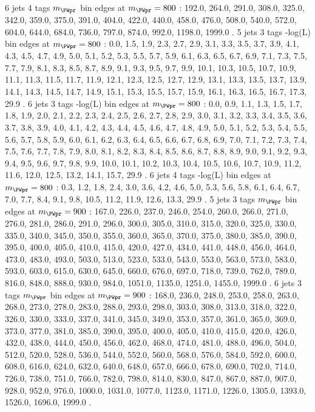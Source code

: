 6 jets 4 \Pqb tags $m_{\PWpr}$ bin edges at $m_{\PWpr}=800$ \GeV:
192.0, 264.0, 291.0, 308.0, 325.0, 342.0, 359.0, 375.0, 391.0, 404.0, 422.0, 440.0, 458.0, 476.0, 508.0, 540.0, 572.0, 604.0, 644.0, 684.0, 736.0, 797.0, 874.0, 992.0, 1198.0, 1999.0 .
5 jets 3 \Pqb tags -log(L) bin edges at $m_{\PWpr}=800$ \GeV:
0.0, 1.5, 1.9, 2.3, 2.7, 2.9, 3.1, 3.3, 3.5, 3.7, 3.9, 4.1, 4.3, 4.5, 4.7, 4.9, 5.0, 5.1, 5.2, 5.3, 5.5, 5.7, 5.9, 6.1, 6.3, 6.5, 6.7, 6.9, 7.1, 7.3, 7.5, 7.7, 7.9, 8.1, 8.3, 8.5, 8.7, 8.9, 9.1, 9.3, 9.5, 9.7, 9.9, 10.1, 10.3, 10.5, 10.7, 10.9, 11.1, 11.3, 11.5, 11.7, 11.9, 12.1, 12.3, 12.5, 12.7, 12.9, 13.1, 13.3, 13.5, 13.7, 13.9, 14.1, 14.3, 14.5, 14.7, 14.9, 15.1, 15.3, 15.5, 15.7, 15.9, 16.1, 16.3, 16.5, 16.7, 17.3, 29.9 .
6 jets 3 \Pqb tags -log(L) bin edges at $m_{\PWpr}=800$ \GeV:
0.0, 0.9, 1.1, 1.3, 1.5, 1.7, 1.8, 1.9, 2.0, 2.1, 2.2, 2.3, 2.4, 2.5, 2.6, 2.7, 2.8, 2.9, 3.0, 3.1, 3.2, 3.3, 3.4, 3.5, 3.6, 3.7, 3.8, 3.9, 4.0, 4.1, 4.2, 4.3, 4.4, 4.5, 4.6, 4.7, 4.8, 4.9, 5.0, 5.1, 5.2, 5.3, 5.4, 5.5, 5.6, 5.7, 5.8, 5.9, 6.0, 6.1, 6.2, 6.3, 6.4, 6.5, 6.6, 6.7, 6.8, 6.9, 7.0, 7.1, 7.2, 7.3, 7.4, 7.5, 7.6, 7.7, 7.8, 7.9, 8.0, 8.1, 8.2, 8.3, 8.4, 8.5, 8.6, 8.7, 8.8, 8.9, 9.0, 9.1, 9.2, 9.3, 9.4, 9.5, 9.6, 9.7, 9.8, 9.9, 10.0, 10.1, 10.2, 10.3, 10.4, 10.5, 10.6, 10.7, 10.9, 11.2, 11.6, 12.0, 12.5, 13.2, 14.1, 15.7, 29.9 .
6 jets 4 \Pqb tags -log(L) bin edges at $m_{\PWpr}=800$ \GeV:
0.3, 1.2, 1.8, 2.4, 3.0, 3.6, 4.2, 4.6, 5.0, 5.3, 5.6, 5.8, 6.1, 6.4, 6.7, 7.0, 7.7, 8.4, 9.1, 9.8, 10.5, 11.2, 11.9, 12.6, 13.3, 29.9 .
5 jets 3 \Pqb tags $m_{\PWpr}$ bin edges at $m_{\PWpr}=900$ \GeV:
167.0, 226.0, 237.0, 246.0, 254.0, 260.0, 266.0, 271.0, 276.0, 281.0, 286.0, 291.0, 296.0, 300.0, 305.0, 310.0, 315.0, 320.0, 325.0, 330.0, 335.0, 340.0, 345.0, 350.0, 355.0, 360.0, 365.0, 370.0, 375.0, 380.0, 385.0, 390.0, 395.0, 400.0, 405.0, 410.0, 415.0, 420.0, 427.0, 434.0, 441.0, 448.0, 456.0, 464.0, 473.0, 483.0, 493.0, 503.0, 513.0, 523.0, 533.0, 543.0, 553.0, 563.0, 573.0, 583.0, 593.0, 603.0, 615.0, 630.0, 645.0, 660.0, 676.0, 697.0, 718.0, 739.0, 762.0, 789.0, 816.0, 848.0, 888.0, 930.0, 984.0, 1051.0, 1135.0, 1251.0, 1455.0, 1999.0 .
6 jets 3 \Pqb tags $m_{\PWpr}$ bin edges at $m_{\PWpr}=900$ \GeV:
168.0, 236.0, 248.0, 253.0, 258.0, 263.0, 268.0, 273.0, 278.0, 283.0, 288.0, 293.0, 298.0, 303.0, 308.0, 313.0, 318.0, 322.0, 326.0, 330.0, 333.0, 337.0, 341.0, 345.0, 349.0, 353.0, 357.0, 361.0, 365.0, 369.0, 373.0, 377.0, 381.0, 385.0, 390.0, 395.0, 400.0, 405.0, 410.0, 415.0, 420.0, 426.0, 432.0, 438.0, 444.0, 450.0, 456.0, 462.0, 468.0, 474.0, 481.0, 488.0, 496.0, 504.0, 512.0, 520.0, 528.0, 536.0, 544.0, 552.0, 560.0, 568.0, 576.0, 584.0, 592.0, 600.0, 608.0, 616.0, 624.0, 632.0, 640.0, 648.0, 657.0, 666.0, 678.0, 690.0, 702.0, 714.0, 726.0, 738.0, 751.0, 766.0, 782.0, 798.0, 814.0, 830.0, 847.0, 867.0, 887.0, 907.0, 928.0, 952.0, 976.0, 1000.0, 1031.0, 1077.0, 1123.0, 1171.0, 1226.0, 1305.0, 1393.0, 1526.0, 1696.0, 1999.0 .
